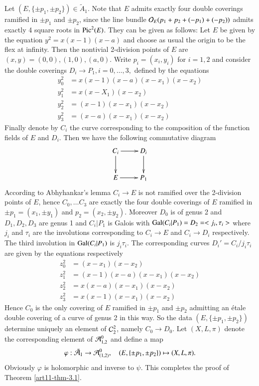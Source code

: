 Let $(E,\{\pm p_{1}, \pm p_{2}\}) \in \tilde{A}_{1}$. Note that $E$ admits exactly four double coverings ramified
in $\pm p_{1}$ and $\pm p_{2}$, since the line bundle $\mathcal{O}_{E}(p_{1} +p_{2} + (-p_{1})+(-p_{2}))$ admits exactly 4 square roots in $\operatorname{Pic}^{2}(E)$. They can be given as  follows: Let $E$ be given by the equation $y^{2} =x(x-1)(x-a)$ and choose as usual the origin to be the flex at infinity. Then the nontivial 2-division points of $E$ are $(x,y) =(0,0),(1,0),(a,0)$. Write $p_{i} =(x_{i},y_{i})$ for $i=1,2$ and consider the double coverings $D_{i}\rightarrow P_{1}, i=0, \ldots,3,$ defined by the equations
\begin{align*}
y_{0}^{2} &= x(x-1)(x-a)(x-x_{1})(x-x_{2})\\
y_{1}^{2} &= x(x-X_{1})(x-x_{2})\\
y_{2}^{2} &= (x-1)(x-x_{1})(x-x_{2})\\
y_{3}^{2} &=(x-a)(x-x_{1})(x-x_{2})
\end{align*}
Finally denote by $C_{i}$ the curve corresponding to the composition of the function fields of $E$ and $D_{i}$. Then we have the following commutative diagram
$$
\xymatrix{
C_{i} \ar[r] \ar[d] & D_{i}\ar[d]\\
E\ar[r] & P_{1} }
$$
According to Abhyhankar's lemma $C_{i} \rightarrow E$ is not ramified over the 2-division points of $E$, hence $C_{0}, \ldots C_{3}$ are exactly the four double coverings of $E$ ramified in $\pm p_{1} =(x_{1}, \pm y_{1})$ and $ p_{2} =(x_{2},\pm y_{2})$. Moreover $D_{0}$ is of genus 2 and $D_{1}, D_{2}, D_{3}$ are genus 1 and $C_{i} |P_{1}$ is Galois with $\operatorname{Gal}(C_{i}|P_{1}) = D_{2} =<j_{i}, \tau_{i} >$ where $j_{i}$ and $\tau_{i}$ are the involutions corresponding to $C_{i}\rightarrow E$ and $ C_{i} \rightarrow D_{i}$ respectively. The third involution in $\operatorname{Gal}(C_{i} |P_{1})$ is $j_{i}\tau_{i}$. The corresponding curves $D_{i}'=C_{i}/j_{i}\tau_{i}$ are given by the equations respectively
\begin{align*}
z_{0}^{2} &= (x-x_{1})(x-x_{2})\\
z_{1}^{2} &= (x-1)(x-a)(x-x_{1})(x-x_{2})\\
z_{2}^{2} &= x(x-a)(x-x_{1})(x-x_{2})\\
z_{3}^{2} &= x(x-1)(x-x_{1})(x-x_{2})
\end{align*}
Hence $C_{0}$ is the only covering of $E$ ramified in $\pm p_{1}$ and $\pm p_{2}$ admitting an \'etale double covering of a curve of genus 2 in this way. So the data $(E, \{\pm p_{1}, \pm p_{2}\})$ determine uniquely an element of $\mathcal{C}_{2}^{2}$, namely $C_{0}\rightarrow D_{0}$. Let $(X, L, \pi)$ denote the corresponding element of $\mathcal{A}_{1,2}^{0}$ and define a map
$$
\varphi : \tilde{\mathcal{A}}_{1} \rightarrow \mathcal{A}_{(1,2)}^{0}, \quad (E, \{\pm p_{1}, \pm p_{2}\}) \mapsto (X, L, \pi).
$$
Obviously $\varphi$ is holomorphic and inverse to $\psi$. This completes the proof of Theorem \ref{art11-thm-3.1}.

